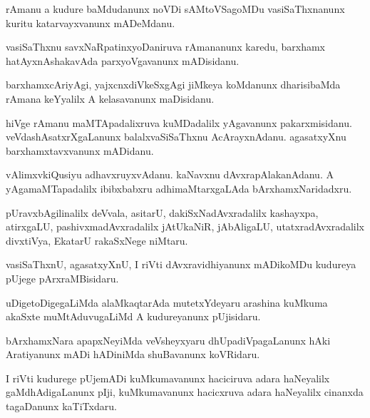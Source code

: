 \documentclass{article}
\begin{document}
\begin{mn}%
rAmanu a kudure baMdudanunx noVDi sAMtoVSagoMDu vasiSaThxnanunx kuritu katarvayxvanunx 
mADeMdanu. 
\end{mn}

\begin{mn}%
vasiSaThxnu savxNaRpatinxyoDaniruva rAmananunx karedu, barxhamx hatAyxnAshakavAda 
parxyoVgavanunx mADisidanu.
\end{mn}

\begin{mn}%
barxhamxcAriyAgi, yajxcnxdiVkeSxgAgi jiMkeya koMdanunx dharisibaMda rAmana keYyalilx A 
kelasavanunx maDisidanu.
\end{mn}

\begin{mn}%
hiVge rAmanu maMTApadalixruva kuMDadalilx yAgavanunx pakarxmisidanu. 
veVdashAsatxrXgaLanunx balalxvaSiSaThxnu AcArayxnAdanu. agasatxyXnu barxhamxtavxvanunx 
mADidanu.
\end{mn}

\begin{mn}%
vAlimxvkiQusiyu adhavxruyxvAdanu. kaNavxnu dAvxrapAlakanAdanu. A yAgamaMTapadalilx 
ibibxbabxru adhimaMtarxgaLAda bArxhamxNaridadxru.
\end{mn}

\begin{mn}%
pUravxbAgilinalilx deVvala, asitarU, dakiSxNadAvxradalilx kashayxpa, atirxgaLU, 
pashivxmadAvxradalilx jAtUkaNiR, jAbAligaLU, utatxradAvxradalilx divxtiVya, EkatarU 
rakaSxNege niMtaru.
\end{mn}

\begin{mn}%
vasiSaThxnU, agasatxyXnU, I riVti dAvxravidhiyanunx mADikoMDu kudureya pUjege 
pArxraMBisidaru.
\end{mn}

\begin{mn}%
uDigetoDigegaLiMda alaMkaqtarAda mutetxYdeyaru arashina kuMkuma akaSxte muMtAduvugaLiMd A 
kudureyanunx pUjisidaru.
\end{mn}

\begin{mn}%
bArxhamxNara apapxNeyiMda veVsheyxyaru dhUpadiVpagaLanunx hAki Aratiyanunx mADi hADiniMda 
shuBavanunx koVRidaru.
\end{mn}

\begin{mn}%
I riVti kudurege pUjemADi kuMkumavanunx haciciruva adara haNeyalilx gaMdhAdigaLanunx pIji, 
kuMkumavanunx hacicxruva adara haNeyalilx cinanxda tagaDanunx kaTiTxdaru.
\end{mn}
\end{document}

